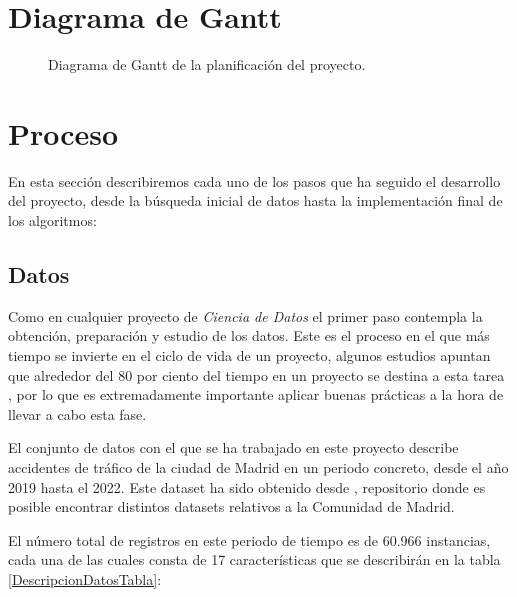 \section{Diagrama de Gantt}

    \begin{figure}[H]
        \centering
        
        \caption{Diagrama de Gantt de la planificación del proyecto.}
        \label{GranttImage}
    \end{figure}

\section{Proceso}

    En esta sección describiremos cada uno de los pasos que ha seguido el desarrollo del proyecto, desde la búsqueda inicial de datos hasta la implementación final de los algoritmos:

    \subsection{Datos}


            Como en cualquier proyecto de \textit{Ciencia de Datos} el primer paso contempla la obtención, preparación y estudio de los datos. Este es el proceso en el que más tiempo se invierte en el ciclo de vida de un proyecto, algunos estudios apuntan que alrededor del 80 por ciento del tiempo en un proyecto se destina a esta tarea \cite{LifecycleDataScienceProjectsTimes}, por lo que es extremadamente importante aplicar buenas prácticas a la hora de llevar a cabo esta fase.

            El conjunto de datos con el que se ha trabajado en este proyecto describe accidentes de tráfico de la ciudad de Madrid en un periodo concreto, desde el año 2019 hasta el 2022. Este dataset ha sido obtenido desde \cite{DatasetMadrid}, repositorio donde es posible encontrar distintos datasets relativos a la Comunidad de Madrid.

            El número total de registros en este periodo de tiempo es de 60.966 instancias, cada una de las cuales consta de 17 características que se describirán en la tabla \ref{DescripcionDatosTabla}:

